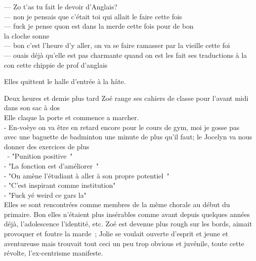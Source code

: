 \documentclass{article}
\begin{document}
\clearpage

--- Zo t’as tu fait le devoir d’Anglais?  \\
--- non je pensais que c'était toi qui allait le faire cette fois\\
--- fuck je pense quon est dans la merde cette fois pour de bon\\

la cloche sonne\\

--- bon c'est l'heure d'y aller, on va se faire ramasser par la vieille cette foi\\
--- ouais déjà qu'elle est pas charmante quand on est les fait ses traductions à la
con cette chippie de prof d'anglais

Elles quittent le halle d'entrée à la hâte.

Deux heures et demie plus tard Zoé range ses cahiers de classe pour l’avant midi dans son sac à dos \\
Elle claque la porte et commence a marcher.\\
- En-voèye on va être en retard encore pour le cours de gym, moi je gosse pas
avec une baguette de badminton une minute de plus qu’il faut; le Jocelyn va
nous donner des exercices de plus\\\
- "Punition positive "\\
- "La fonction est d’améliorer "\\
- "On amène l’étudiant à aller à son propre potentiel "\\
- "C’est inspirant comme institution"\\
- "Fuck yé weird ce gars la"\\

Elles se sont rencontrées comme membres de la même chorale au début du
primaire. Bon elles n’étaient plus insérables comme avant depuis quelques
années déjà, l’adolescence l’identité, etc. Zoé est devenue plus rough sur
les bords, aimait provoquer et foutre la marde ; Jolie se voulait ouverte
d’esprit et jeune et aventureuse mais trouvait tout ceci un peu trop obvious et
juvénile, toute cette révolte, l’ex-centrisme manifeste.\\
\end{document}
